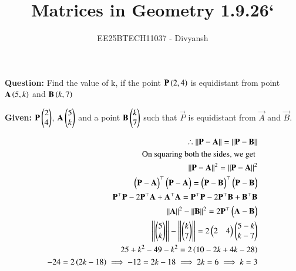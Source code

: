 \documentclass[journal,12pt,onecolumn]{IEEEtran}
\title{Matrices in Geometry 1.9.26`}
\author{EE25BTECH11037 - Divyansh}
\theoremstyle{remark}
\begin{document}
\vspace{3cm}
\maketitle
{\let\newpage\relax\maketitle}
\textbf{Question: }
Find the value of k, if the point $\mathbf{P}\left(2,4\right)$ is equidistant from point $\mathbf{A}\left(5,k\right)$ and $\mathbf{B}\left(k,7\right)$

\textbf{Given: } 
$\mathbf{P}\begin{pmatrix}2\\4\end{pmatrix}$, $\mathbf{A}\begin{pmatrix}5\\k\end{pmatrix}$ and a point $\mathbf{B} \begin{pmatrix}k \\ 7\end{pmatrix}$ such that $\vec{P}$ is equidistant from $\vec{A}$ and $\vec{B}$. 

\begin{align}
    \therefore \left\lVert\mathbf{P}-\mathbf{A}\right\rVert=\left\lVert\mathbf{P}-\mathbf{B}\right\rVert\\
    \text{On squaring both the sides, we get }\\
    \left\lVert\mathbf{P}-\mathbf{A}\right\rVert^2=\left\lVert\mathbf{P}-\mathbf{A}\right\rVert^2\\
    \begin{pmatrix}\mathbf{P}-\mathbf{A}\end{pmatrix}^{\top}\begin{pmatrix}\mathbf{P}-\mathbf{A}\end{pmatrix}=\begin{pmatrix}\mathbf{P}-\mathbf{B}\end{pmatrix}^{\top}\begin{pmatrix}\mathbf{P}-\mathbf{B}\end{pmatrix}\\
    \mathbf{P}^{\top}\mathbf{P} - 2\mathbf{P}^{\top}\mathbf{A} + \mathbf{A}^{\top}\mathbf{A} =\mathbf{P}^{\top}\mathbf{P} - 2\mathbf{P}^{\top}\mathbf{B} + \mathbf{B}^{\top}\mathbf{B}\\
    \left\lVert\mathbf{A}\right\rVert^2 - \left\lVert\mathbf{B}\right\rVert^2=2\mathbf{P}^{\top}\begin{pmatrix}\mathbf{A}-\mathbf{B}\end{pmatrix}\\
    \left\lVert\begin{pmatrix}5\\k\end{pmatrix}\right\rVert - \left\lVert\begin{pmatrix}k\\7\end{pmatrix}\right\rVert=2\begin{pmatrix}2 & 4\end{pmatrix}\begin{pmatrix}5-k \\ k-7\end{pmatrix}\\
    25+k^2 - 49 -k^2=2\left(10-2k + 4k-28\right)\\
    -24=2\left(2k-18\right) \implies -12=2k-18 \implies 2k=6 \implies k=3
\end{align}
\end{document}
